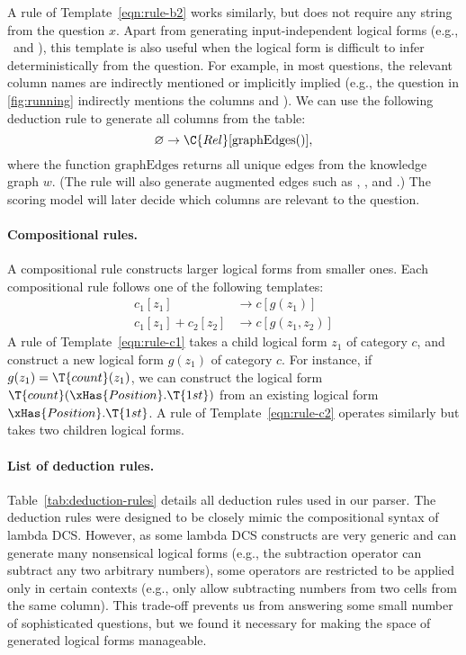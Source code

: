 A rule of Template~\ref{eqn:rule-b2} works similarly,
but does not require any string from the question $x$.
Apart from generating input-independent logical forms
(e.g., \T{>=}\, and ),
this template is also useful when the logical form
is difficult to infer deterministically from the question.
For example, in most questions,
the relevant column names are indirectly mentioned
or implicitly implied
(e.g., the question \runningEx
in \ref{fig:running}
indirectly mentions the columns  and ).
We can use the following deduction rule
to generate all columns from the table:
\begin{equation}
\varnothing \to \C{Rel}[\mathrm{graphEdges}()],
\end{equation}
where the function $\mathrm{graphEdges}$ returns all unique edges
from the knowledge graph $w$. (The rule will also generate
augmented edges such as , , and .)
The scoring model will later decide which columns
are relevant to the question.

\paragraph{Compositional rules.}
A compositional rule constructs larger logical forms
from smaller ones.
Each compositional rule follows one of the following templates:
\begin{align}
c_1[z_1] &\to c[g(z_1)] \label{eqn:rule-c1} \\
c_1[z_1] + c_2[z_2] &\to c[g(z_1, z_2)] \label{eqn:rule-c2}
\end{align}
A rule of Template~\ref{eqn:rule-c1}
takes a child logical form $z_1$ of category $c$,
and construct a new logical form $g(z_1)$ of category $c$.
For instance, if $g(z_1) = \T{count}(z_1)$,
we can construct the logical form
$\T{count}(\xHas{Position}.\T{1st})$
from an existing logical form $\xHas{Position}.\T{1st}$.
A rule of Template~\ref{eqn:rule-c2}
operates similarly but takes two children logical forms.

\paragraph{List of deduction rules.}
Table~\ref{tab:deduction-rules}
details all deduction rules used in our parser.
The deduction rules were designed to be closely mimic
the compositional syntax of lambda DCS.
However, as some lambda DCS constructs are very generic
and can generate many nonsensical logical forms
(e.g., the subtraction operator can subtract
any two arbitrary numbers),
some operators are restricted to be applied
only in certain contexts
(e.g., only allow subtracting numbers from two cells
from the same column).
This trade-off prevents us from
answering some small number of sophisticated questions,
but we found it necessary for making the space
of generated logical forms manageable.

